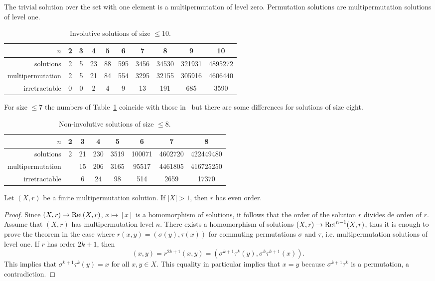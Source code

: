 The trivial solution over the set with one element is a multipermutation of level zero. 
Permutation solutions are multipermutation solutions of level one. 

\begin{example}

\end{example}

\begin{example}

\end{example}

\begin{table}[H]
\centering
\caption{Involutive solutions of size $\leq10$.}
\begin{tabular}{|r|ccccccccc|}
\hline
$n$ & 2 & 3 & 4 & 5 & 6 & 7 & 8 & 9 & 10\tabularnewline
\hline 
solutions & 2 & 5 & 23 & 88 & 595 & 3456 & 34530 & 321931 & 4895272\tabularnewline
multipermutation & 2 & 5 & 21 & 84 & 554 & 3295 & 32155 & 305916 & 4606440\tabularnewline
irretractable & 0 & 0 & 2 & 4 & 9 & 13 & 191 & 685 & 3590\tabularnewline
\hline
\end{tabular}
\label{tab:INV_mp}
\end{table}

For size $\leq7$ the numbers of Table~\ref{tab:INV_mp} coincide with those in~\cite{MR1722951}
but there are some differences for solutions of size eight. 

\begin{table}[H]
\centering
\caption{Non-involutive solutions of size $\leq8$.}
\begin{tabular}{|r|ccccccc|}
\hline
$n$ & 2 & 3 & 4 & 5 & 6 & 7 & 8 \tabularnewline
\hline 
solutions & 2 & 21 & 230 & 3519 & 100071 & 4602720  & 422449480 \tabularnewline
multipermutation &  & 15 & 206 & 3165 & 95517 & 4461805 & 416725250 \tabularnewline
irretractable & & 6 & 24 & 98 & 514 & 2659 & 17370\tabularnewline
\hline
\end{tabular}
\label{tab:mp}
\end{table}


\begin{theorem}
\label{thm:CJKAV}
    Let $(X,r)$ be a finite multipermutation solution. If $|X|>1$, then $r$ has even order. 
\end{theorem}

\begin{proof}
    Since $(X,r)\to\operatorname{Ret}(X,r)$, $x\mapsto[x]$ is a homomorphism of solutions, 
    it follows that the order of the solution $\overline{r}$ divides de orden of $r$. 
    Assume that $(X,r)$ has multipermutation level $n$. 
    There exists a homomorphism of solutions $(X,r)\to\operatorname{Ret}^{n-1}(X,r)$, thus 
    it is enough to prove the theorem in the case where
    $r(x,y)=(\sigma(y),\tau(x))$ for commuting permutations $\sigma$ and $\tau$, i.e. 
    multipermutation solutions of level one. If $r$ has order $2k+1$, then 
    \[
    (x,y)=r^{2k+1}(x,y)=(\sigma^{k+1}\tau^k(y),\sigma^k\tau^{k+1}(x)).
    \]
    This implies that $\sigma^{k+1}\tau^k(y)=x$ for all $x,y\in X$. This equality in particular 
    implies that $x=y$ because $\sigma^{k+1}\tau^k$ is a permutation, a contradiction. 
\end{proof}

